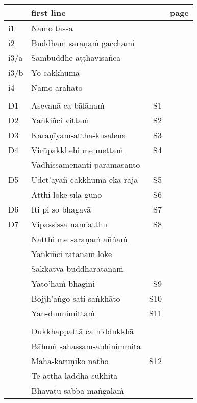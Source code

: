 {\centering
\fontsize{12.5}{16}\selectfont

\begin{tabular}{@{}l l r r@{}}
  & first line & & page \\
  \hline
  i1  & Namo tassa & & \pageref{namo-tassa} \\
  i2  & Buddhaṁ saraṇaṁ gacchāmi & & \pageref{buddham-saranam} \\
  i3/a  & Sambuddhe aṭṭhavīsañca & & \pageref{sambuddhe} \\
  i3/b  & Yo cakkhumā & & \pageref{yo-cakkhuma} \\
  i4  & Namo arahato & & \pageref{namo-arahato} \\
      & & & \\
  D1 & Asevanā ca bālānaṁ & S1 & \pageref{asevana} \\
  D2 & Yaṅkiñci vittaṁ & S2 & \pageref{yankinci-vittam} \\
  D3 & Karaṇīyam-attha-kusalena & S3 & \pageref{karaniyam-attha} \\
  D4 & Virūpakkhehi me mettaṁ & S4 & \pageref{virupakkhehi} \\
  & Vadhissamenanti parāmasanto & & \pageref{vadhissamenanti} \\
  D5 & Udet'ayañ-cakkhumā eka-rājā & S5 & \pageref{udetayan-cakkhuma} \\
  & Atthi loke sīla-guṇo & S6 & \pageref{atthi-loke} \\
  D6 & Iti pi so bhagavā & S7 & \pageref{iti-pi-so} \\
  D7 & Vipassissa nam'atthu & S8 & \pageref{vipassissa} \\
  & Natthi me saraṇaṁ aññaṁ & & \pageref{natthi-me} \\
  & Yaṅkiñci ratanaṁ loke & & \pageref{yankinci-ratanam} \\
  & Sakkatvā buddharatanaṁ & & \pageref{sakkatva} \\
  & Yato'haṁ bhagini & S9 & \pageref{yato-ham-bhagini} \\
  & Bojjh'aṅgo sati-saṅkhāto & S10 & \pageref{bojjhango} \\
  & Yan-dunnimittaṁ & S11 & \pageref{yan-dunnimittam} \\
      & & & \\
  & Dukkhappattā ca niddukkhā & & \pageref{dukkhappatta} \\
  & Bāhuṁ sahassam-abhinimmita & & \pageref{bahum} \\
  & Mahā-kāruṇiko nātho & S12 & \pageref{maha-karuniko} \\
  & Te attha-laddhā sukhitā & & \pageref{te-attha-laddha} \\
  & Bhavatu sabba-maṅgalaṁ & & \pageref{bhavatu} \\
\end{tabular}

}

